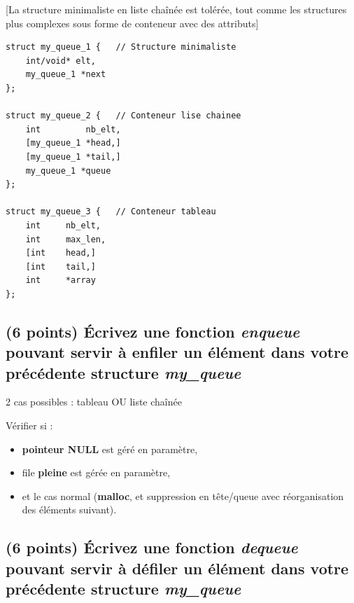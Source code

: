 \documentclass[11pt,a4paper]{article}
\begin{document}
\bigskip

\begin{center}
[La structure minimaliste en liste chaînée est tolérée, tout comme les structures plus complexes sous forme de conteneur avec des attributs]
\end{center}

\lstset{language=c}
\begin{lstlisting}[frame=single]
struct my_queue_1 {   // Structure minimaliste
	int/void* elt,
	my_queue_1 *next
};

struct my_queue_2 {   // Conteneur lise chainee
	int			nb_elt,
	[my_queue_1 *head,]
	[my_queue_1 *tail,]
	my_queue_1 *queue
};

struct my_queue_3 {   // Conteneur tableau
	int		nb_elt,
	int		max_len,
	[int	head,]
	[int	tail,]
	int		*array
};
\end{lstlisting}

\bigskip


\newpage

\subsection{(6 points) \'Ecrivez une fonction \og \textit{enqueue} \fg{} pouvant servir à enfiler un élément dans votre précédente structure \og \textit{my\_queue} \fg{} }

\bigskip

\begin{center}


\vspace{2cm}

2 cas possibles : tableau OU liste chaînée

\bigskip

Vérifier si :
\begin{itemize}
\item \textbf{pointeur NULL} est géré en paramètre,
\item file \textbf{pleine} est gérée en paramètre,
\item et le cas normal (\textbf{malloc}, et suppression en tête/queue  avec réorganisation des éléments suivant).
\end{itemize}
\end{center}

\bigskip


\newpage

\subsection{(6 points) \'Ecrivez une fonction \og \textit{dequeue} \fg{} pouvant servir à défiler un élément dans votre précédente structure \og \textit{my\_queue} \fg{} }
\end{document}
